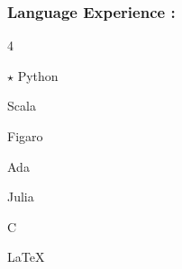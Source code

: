 \documentclass{article}
\newenvironment{mylist}[2]{
  \subsubsection*{#1}
  \begin{multicols}{#2}
  \small
  \begin{list}{}{}
   \setlength{\topsep}{0pt}
   \setlength{\itemsep}{1pt}
   \setlength{\parskip}{0pt}
   \setlength{\parsep}{0pt}}{\end{list}\end{multicols}\normalsize}
\newenvironment{**mylist}[2]{
  \subsubsection*{#1\hfill\small#2}
  \small
  \begin{list}{}{}
   \setlength{\topsep}{0pt}
   \setlength{\itemsep}{1pt}
   \setlength{\parskip}{0pt}
   \setlength{\parsep}{0pt}}{\end{list}\normalsize}
\def\bsp{-.3in}
\begin{document}
\begin{mylist}{Language Experience :}{4}
\item[$\star$] Python
\item Scala
\item Figaro
\item Ada
\item Julia
\item C %
\item \LaTeX
\end{mylist}

\begin{comment}
\hrulefill

\begin{mylist}{Language Experience :}{4}
\item Strongly Typed
\item Functional
\item Imperative
\item Scripting
\item Markup
\item Object Oriented
\item Mathematical
\item Probabilistic
\end{mylist}
\end{comment}

\begin{comment}
\begin{**mylist}{Software :}{}
\item Git, Mercurial, SVN
\item FreeBSD, Various Linux Distributions
\item Windows XP,7
\end{**mylist}
\end{comment}

\newcommand{\BSec}[1]{
\vspace{1em}
\noindent{\hspace{\bsp} \LARGE{\bf #1}{ }\hrulefill}}
\TabPositions{2in} %
\def\tabb{\tab- }  %
\end{document}
